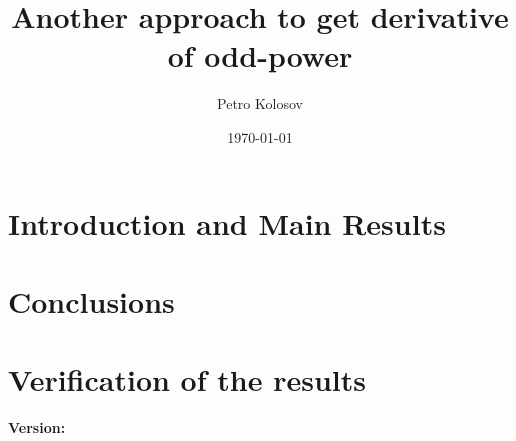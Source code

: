 \documentclass[12pt,letterpaper,oneside,reqno]{amsart}
\title[Another approach to get derivative of odd-power]
{Another approach to get derivative of odd-power}
\author[Petro Kolosov]{Petro Kolosov}
\date{\today}
\begin{document}
    \begin{abstract}
        
    \end{abstract}

    \maketitle

    \tableofcontents


    \section{Introduction and Main Results} \label{sec:introduction}
    
    
    
    


    \section{Conclusions}\label{sec:conclusions}
    


    \section{Verification of the results}\label{sec:verification-of-the-results}
    

    
    
    \noindent \textbf{Version:} 
\end{document}
